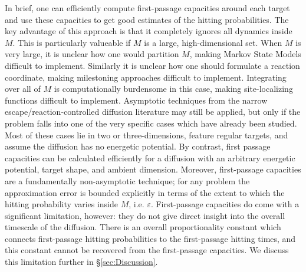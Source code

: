 \documentclass[12pt, nofootinbib,english, amsmath, amssymb, aps, priprint, graphicx,floatfix,draft]{revtex4-1}
\theoremstyle{plain}
\theoremstyle{definition}
\theoremstyle{plain}
\begin{document}
In brief, one can efficiently compute first-passage capacities around each target and use these capacities to get good estimates of the hitting probabilities.  The key advantage of this approach is that it completely ignores all dynamics inside $M$.  This is particularly valueable if $M$ is a large, high-dimensional set.  When $M$ is very large, it is unclear how one would partition $M$, making Markov State Models difficult to implement.  Similarly it is unclear how one should formulate a reaction coordinate, making milestoning approaches difficult to implement.  Integrating over all of $M$ is computationally burdensome in this case, making site-localizing functions difficult to implement.  Asymptotic techniques from the narrow escape/reaction-controlled diffusion literature may still be applied, but only if the problem falls into one of the very specific cases which have already been studied.  Most of these cases lie in two or three-dimensions, feature regular targets, and assume the diffusion has no energetic potential.  By contrast, first passage capacities can be calculated efficiently for a diffusion with an arbitrary energetic potential, target shape, and ambient dimension.  Moreover, first-passage capacities are a fundamentally non-asymptotic technique; for any problem the approximation error is bounded explicitly in terms of the extent to which the hitting probability varies inside $M$, i.e. $\varepsilon$.   First-passage capacities do come with a significant limitation, however: they do not give direct insight into the overall timescale of the diffusion. There is an overall proportionality constant which connects first-passage hitting probabilities to the first-passage hitting times, and this constant cannot be recovered from the first-passage capacities.  We discuss this limitation further in \S\ref{sec:Discussion}.
\end{document}
